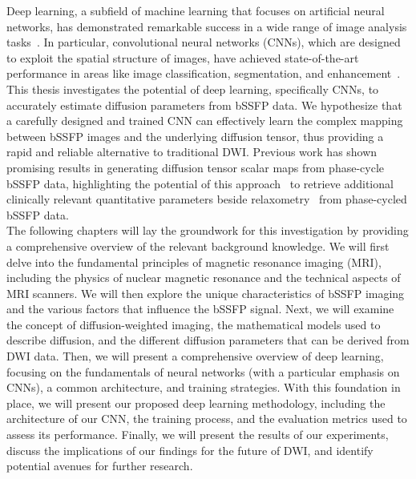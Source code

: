 Deep learning, a subfield of machine learning that focuses on artificial neural networks, has demonstrated remarkable success in a wide range of image analysis tasks~\autocite{chai_deep_2021}.
In particular, convolutional neural networks (CNNs), which are designed to exploit the spatial structure of images, have achieved state-of-the-art performance in areas like image classification, segmentation, and enhancement~\autocite{cardoso_monai_2022, ronneberger_u-net_2015, he_deep_2016}.
This thesis investigates the potential of deep learning, specifically CNNs, to accurately estimate diffusion parameters from bSSFP data.
We hypothesize that a carefully designed and trained CNN can effectively learn the complex mapping between bSSFP images and the underlying diffusion tensor, thus providing a rapid and reliable alternative to traditional DWI.
Previous work has shown promising results in generating diffusion tensor scalar maps from phase-cycle bSSFP data, highlighting the potential of this approach~\autocite{birk_high-resolution_2022} to retrieve additional clinically relevant quantitative parameters beside relaxometry~\autocite{heule_multi-parametric_2020} from phase-cycled bSSFP data. \\

The following chapters will lay the groundwork for this investigation by providing a comprehensive overview of the relevant background knowledge.
We will first delve into the fundamental principles of magnetic resonance imaging (MRI), including the physics of nuclear magnetic resonance and the technical aspects of MRI scanners.
We will then explore the unique characteristics of bSSFP imaging and the various factors that influence the bSSFP signal.
Next, we will examine the concept of diffusion-weighted imaging, the mathematical models used to describe diffusion, and the different diffusion parameters that can be derived from DWI data.
Then, we will present a comprehensive overview of deep learning, focusing on the fundamentals of neural networks (with a particular emphasis on CNNs), a common architecture, and training strategies.
With this foundation in place, we will present our proposed deep learning methodology, including the architecture of our CNN, the training process, and the evaluation metrics used to assess its performance.
Finally, we will present the results of our experiments, discuss the implications of our findings for the future of DWI, and identify potential avenues for further research.
